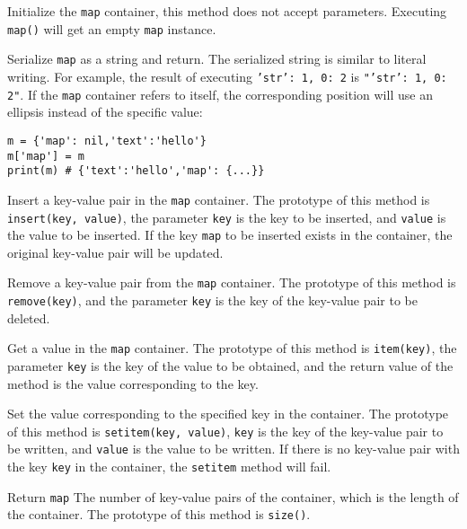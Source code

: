 
Initialize the \texttt{map} container, this method does not accept parameters. Executing \texttt{map()} will get an empty \texttt{map} instance.

Serialize \texttt{map} as a string and return. The serialized string is similar to literal writing. For example, the result of executing \texttt{{'str': 1, 0: 2}} is \texttt{"{'str': 1, 0: 2}"}. If the \texttt{map} container refers to itself, the corresponding position will use an ellipsis instead of the specific value:
\begin{lstlisting}[language=berry, numbers=none]
m = {'map': nil,'text':'hello'}
m['map'] = m
print(m) # {'text':'hello','map': {...}}
\end{lstlisting}


Insert a key-value pair in the \texttt{map} container. The prototype of this method is \texttt{insert(key, value)}, the parameter \texttt{key} is the key to be inserted, and \texttt{value} is the value to be inserted. If the key \texttt{map} to be inserted exists in the container, the original key-value pair will be updated.


Remove a key-value pair from the \texttt{map} container. The prototype of this method is \texttt{remove(key)}, and the parameter \texttt{key} is the key of the key-value pair to be deleted.


Get a value in the \texttt{map} container. The prototype of this method is \texttt{item(key)}, the parameter \texttt{key} is the key of the value to be obtained, and the return value of the method is the value corresponding to the key.


Set the value corresponding to the specified key in the container. The prototype of this method is \texttt{setitem(key, value)}, \texttt{key} is the key of the key-value pair to be written, and \texttt{value} is the value to be written. If there is no key-value pair with the key \texttt{key} in the container, the \texttt{setitem} method will fail.


Return \texttt{map} The number of key-value pairs of the container, which is the length of the container. The prototype of this method is \texttt{size()}.

